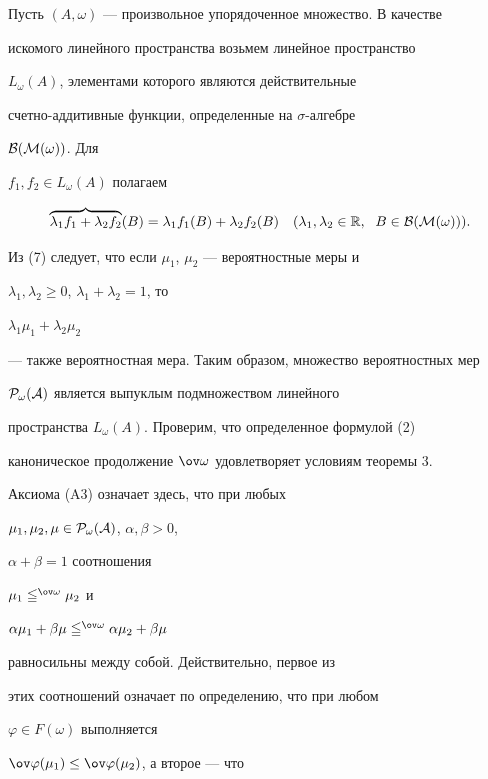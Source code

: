 \begin{pf} 


Пусть $(A,\omega)$ --- произвольное упорядоченное множество. В качестве 


искомого линейного пространства возьмем линейное пространство 


$L_\omega(A)$, элементами которого являются действительные 


счетно-аддитивные функции, определенные на $\sigma$-алгебре 


$\cal B(M(\omega))$. Для 


$f_1,f_2\in L_\omega(A)$ полагаем 


\begin{equation} 


\overbrace{\lambda_1f_1+\lambda_2f_2}(B)=\lambda_1f_1(B)+ 


\lambda_2f_2(B)\quad (\lambda_1,\lambda_2\in\Bbb R, \ \; 


B\in\cal B(M(\omega))). 


\end{equation} 


Из (7) следует, что если $\mu_1$, $\mu_2$ --- вероятностные меры и 


$\lambda_1,\lambda_2\ge 0$, $\lambda_1+\lambda_2=1$, то 


$\lambda_1\mu_1+\lambda_2\mu_2$ 


--- также вероятностная мера. Таким образом, множество вероятностных мер 


$\cal P_\omega(A)$ является выпуклым подмножеством линейного 


пространства $L_\omega(A)$. Проверим, что определенное формулой (2) 


каноническое продолжение $\ov\omega$ удовлетворяет условиям теоремы 3. 


Аксиома (A3) означает здесь, что при любых 


$\mu_1,\mu_2,\mu\in\cal P_\omega(A)$, $\alpha,\beta>0$, 


$\alpha+\beta=1$ соотношения 


$\mu_1\leqq^{\ov\omega}\mu_2$ и 


$\alpha\mu_1+\beta\mu\leqq^{\ov\omega}\alpha\mu_2+\beta\mu$ 


равносильны между собой. Действительно, первое из 


этих соотношений означает по определению, что при любом 


$\varphi\in F(\omega)$ выполняется 


$\ov\varphi(\mu_1)\le\ov\varphi(\mu_2)$, а второе --- что 



\end{pf}

